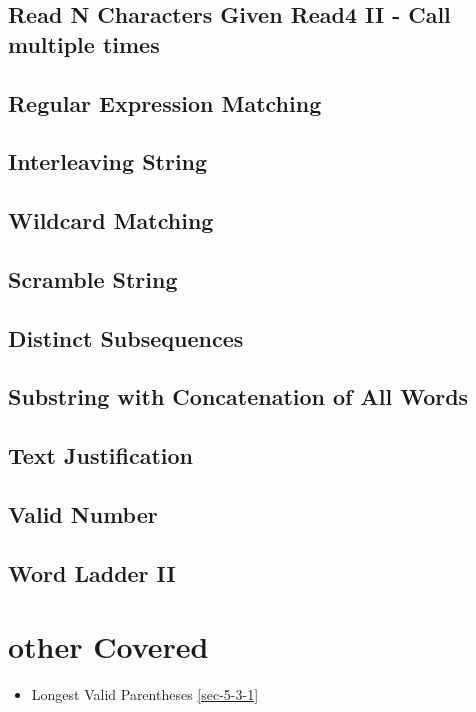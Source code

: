\documentclass[12pt]{book}
\begin{document}
\subsection{Read N Characters Given Read4 II - Call multiple times}
\label{sec-2-3-4}
\subsection{Regular Expression Matching}
\label{sec-2-3-5}
\subsection{Interleaving String}
\label{sec-2-3-6}
\subsection{Wildcard Matching}
\label{sec-2-3-7}
\subsection{Scramble String}
\label{sec-2-3-8}
\subsection{Distinct Subsequences}
\label{sec-2-3-9}
\subsection{Substring with Concatenation of All Words}
\label{sec-2-3-10}
\subsection{Text Justification}
\label{sec-2-3-11}
\subsection{Valid Number}
\label{sec-2-3-12}
\subsection{Word Ladder II}
\label{sec-2-3-13}
\section{other Covered}
\label{sec-2-4}
\begin{itemize}
\item Longest Valid Parentheses
\ref{sec-5-3-1}
\end{itemize}
\end{document}
